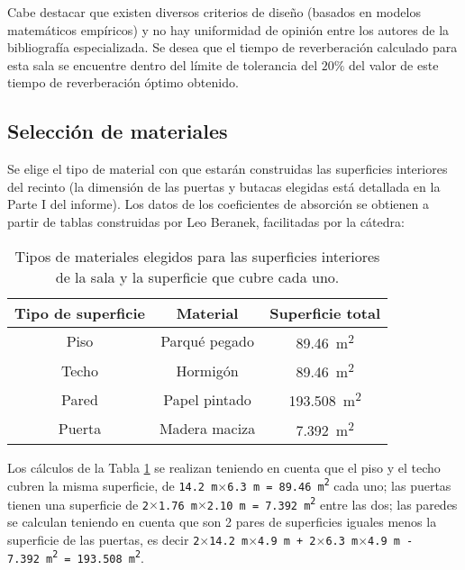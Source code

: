 	Cabe destacar que existen diversos criterios de diseño (basados en modelos matemáticos empíricos) y no hay uniformidad de opinión entre los autores de la bibliografía especializada. Se desea que el tiempo de reverberación calculado para esta sala se encuentre dentro del límite de tolerancia del $20\%$ del valor de este tiempo de reverberación óptimo obtenido.

\subsection{Selección de materiales}

	Se elige el tipo de material con que estarán construidas las superficies interiores del recinto (la dimensión de las puertas y butacas elegidas está detallada en la Parte I del informe). Los datos de los coeficientes de absorción se obtienen a partir de tablas construidas por Leo Beranek, facilitadas por la cátedra:
	
		\begin{table}[H]
			\centering
			\begin{tabular}{ccc}
			\toprule
			\textbf{Tipo de superficie} & \textbf{Material} & \textbf{Superficie total}\\
			\midrule
			Piso & Parqué pegado & \SI{89.46}{\square\m}\\
			\midrule
			Techo & Hormigón & \SI{89.46}{\square\m}\\
			\midrule
			Pared & Papel pintado & \SI{193.508}{\square\m}\\
			\midrule
			Puerta & Madera maciza & \SI{7.392}{\square\m}\\
			\bottomrule
			\end{tabular}
			\caption{Tipos de materiales elegidos para las superficies interiores de la sala y la superficie que cubre cada uno.}
			\label{tabla:superficies}
		\end{table}
		
		Los cálculos de la Tabla \ref{tabla:superficies} se realizan teniendo en cuenta que el piso y el techo cubren la misma superficie, de \texttt{\SI{14.2}{\m}$\times$\SI{6.3}{\m} = \SI{89.46}{\square\m}} cada uno; las puertas tienen una superficie de \texttt{2$\times$\SI{1.76}{\m}$\times$\SI{2.10}{\m} = \SI{7.392}{\square\m}} entre las dos; las paredes se calculan teniendo en cuenta que son 2 pares de superficies iguales menos la superficie de las puertas, es decir \texttt{2$\times$\SI{14.2}{\m}$\times$\SI{4.9}{\m} + 2$\times$\SI{6.3}{\m}$\times$\SI{4.9}{\m} - \SI{7.392}{\square\m} = \SI{193.508}{\square\m}}.\\
		
